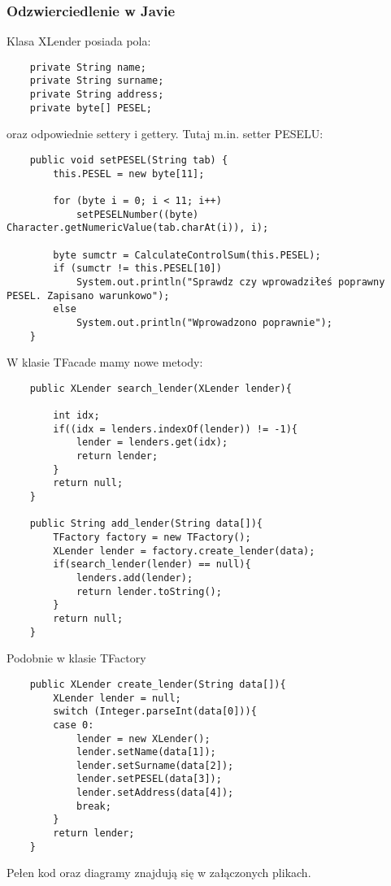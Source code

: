 \documentclass{article}
\begin{document}
\subsubsection{Odzwierciedlenie w Javie}
Klasa XLender posiada pola:
\begin{verbatim}
	private String name;
	private String surname;
	private String address;
	private byte[] PESEL;
\end{verbatim}
oraz odpowiednie settery i gettery. Tutaj m.in. setter PESELU:
\begin{verbatim}
	public void setPESEL(String tab) {
		this.PESEL = new byte[11];

		for (byte i = 0; i < 11; i++)
			setPESELNumber((byte) Character.getNumericValue(tab.charAt(i)), i);

		byte sumctr = CalculateControlSum(this.PESEL);
		if (sumctr != this.PESEL[10])
			System.out.println("Sprawdz czy wprowadziłeś poprawny PESEL. Zapisano warunkowo");
		else
			System.out.println("Wprowadzono poprawnie");
	}
\end{verbatim}
W klasie TFacade mamy nowe metody:
\begin{verbatim}
	public XLender search_lender(XLender lender){
		
		int idx;
		if((idx = lenders.indexOf(lender)) != -1){
			lender = lenders.get(idx);
			return lender;
		}
		return null;
	}

	public String add_lender(String data[]){
		TFactory factory = new TFactory();
		XLender lender = factory.create_lender(data);
		if(search_lender(lender) == null){
			lenders.add(lender);
			return lender.toString();
		}
		return null;
	}
\end{verbatim}
Podobnie w klasie TFactory
\begin{verbatim}
	public XLender create_lender(String data[]){
		XLender lender = null;
		switch (Integer.parseInt(data[0])){
		case 0:
			lender = new XLender();
			lender.setName(data[1]);
			lender.setSurname(data[2]);
			lender.setPESEL(data[3]);
			lender.setAddress(data[4]);
			break;
		}
		return lender;
	}
\end{verbatim}
Pełen kod oraz diagramy znajdują się w załączonych plikach.
\end{document}
